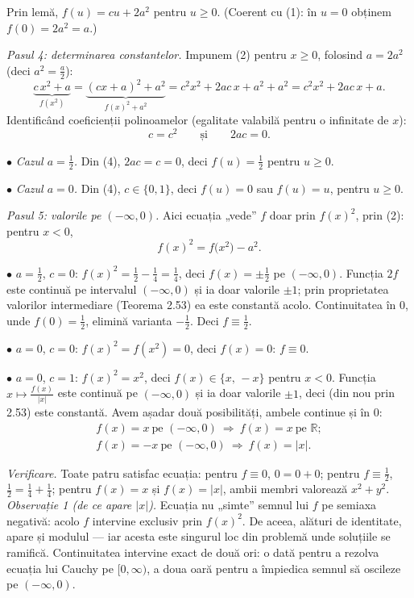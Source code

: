 Prin lemă, $f(u)=cu+2a^{2}$ pentru $u\ge0$. (Coerent cu (1): în $u=0$ obținem $f(0)=2a^{2}=a$.)

\emph{Pasul 4: determinarea constantelor.} Impunem (2) pentru $x\ge0$, folosind $a=2a^{2}$ (deci $a^{2}=\frac a2$):
\[ \underbrace{c\,x^{2}+a}_{f(x^{2})}=\underbrace{(cx+a)^{2}+a^{2}}_{f(x)^{2}+a^{2}}=c^{2}x^{2}+2ac\,x+a^{2}+a^{2}=c^{2}x^{2}+2ac\,x+a . \]
Identificând coeficienții polinoamelor (egalitate valabilă pentru o infinitate de $x$):
\[ c=c^{2}\qquad\text{și}\qquad 2ac=0 . \tag{4} \]

$\bullet$ \emph{Cazul $a=\frac12$.} Din (4), $2ac=c=0$, deci $f(u)=\frac12$ pentru $u\ge0$.

$\bullet$ \emph{Cazul $a=0$.} Din (4), $c\in\{0,1\}$, deci $f(u)=0$ sau $f(u)=u$, pentru $u\ge0$.

\emph{Pasul 5: valorile pe $(-\infty,0)$.} Aici ecuația „vede'' $f$ doar prin $f(x)^{2}$, prin (2): pentru $x<0$,
\[ f(x)^{2}=f\bigl(x^{2}\bigr)-a^{2} . \]

$\bullet$ $a=\frac12$, $c=0$: $f(x)^{2}=\frac12-\frac14=\frac14$, deci $f(x)=\pm\frac12$ pe $(-\infty,0)$. Funcția $2f$ este continuă pe intervalul $(-\infty,0)$ și ia doar valorile $\pm1$; prin proprietatea valorilor intermediare (Teorema 2.53) ea este constantă acolo. Continuitatea în $0$, unde $f(0)=\frac12$, elimină varianta $-\frac12$. Deci $f\equiv\frac12$.

$\bullet$ $a=0$, $c=0$: $f(x)^{2}=f(x^{2})=0$, deci $f(x)=0$: $f\equiv0$.

$\bullet$ $a=0$, $c=1$: $f(x)^{2}=x^{2}$, deci $f(x)\in\{x,\,-x\}$ pentru $x<0$. Funcția $x\mapsto\frac{f(x)}{|x|}$ este continuă pe $(-\infty,0)$ și ia doar valorile $\pm1$, deci (din nou prin 2.53) este constantă. Avem așadar două posibilități, ambele continue și în $0$:
\[ \begin{gathered} f(x)=x\ \text{pe }(-\infty,0)\ \Longrightarrow\ f(x)=x\ \text{pe }\mathbb{R};\\ f(x)=-x\ \text{pe }(-\infty,0)\ \Longrightarrow\ f(x)=|x| . \end{gathered} \]


\emph{Verificare.} Toate patru satisfac ecuația: pentru $f\equiv0$, $0=0+0$; pentru $f\equiv\frac12$, $\frac12=\frac14+\frac14$; pentru $f(x)=x$ și $f(x)=|x|$, ambii membri valorează $x^{2}+y^{2}$.\\[2pt]
\emph{Observație 1 (de ce apare $|x|$).} Ecuația nu „simte'' semnul lui $f$ pe semiaxa negativă: acolo $f$ intervine exclusiv prin $f(x)^{2}$. De aceea, alături de identitate, apare și modulul --- iar acesta este singurul loc din problemă unde soluțiile se ramifică. Continuitatea intervine exact de două ori: o dată pentru a rezolva ecuația lui Cauchy pe $[0,\infty)$, a doua oară pentru a împiedica semnul să oscileze pe $(-\infty,0)$.

